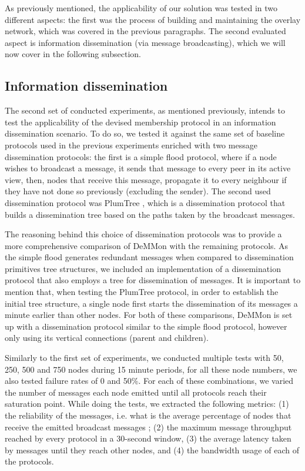 As previously mentioned, the applicability of our solution was tested in two different aspects: the first was the process of building and maintaining the overlay network, which was covered in the previous paragraphs. The second evaluated aspect is information dissemination (via message broadcasting), which we will now cover in the following subsection.

\subsection{Information dissemination} \label{results:inf_diss}

The second set of conducted experiments, as mentioned previously, intends to test the applicability of the devised membership protocol in an information dissemination scenario. To do so, we tested it against the same set of baseline protocols used in the previous experiments enriched with two message dissemination protocols: the first is a simple flood protocol, where if a node wishes to broadcast a message, it sends that message to every peer in its active view, then, nodes that receive this message, propagate it to every neighbour if they have not done so previously (excluding the sender). The second used dissemination protocol was PlumTree \cite{plumTree}, which is a dissemination protocol that builds a dissemination tree based on the paths taken by the broadcast messages.

The reasoning behind this choice of dissemination protocols was to provide a more comprehensive comparison of DeMMon with the remaining protocols. As the simple flood generates redundant messages when compared to dissemination primitives tree structures, we included an implementation of a dissemination protocol that also employs a tree for dissemination of messages. It is important to mention that, when testing the PlumTree protocol, in order to establish the initial tree structure, a single node first starts the dissemination of its messages a minute earlier than other nodes. For both of these comparisons, DeMMon is set up with a dissemination protocol similar to the simple flood protocol, however only using its vertical connections (parent and children).

Similarly to the first set of experiments, we conducted multiple tests with 50, 250, 500 and 750 nodes during 15 minute periods, for all these node numbers, we also tested failure rates of 0 and 50\%. For each of these combinations, we varied the number of messages each node emitted until all protocols reach their saturation point. While doing the tests, we extracted the following metrics: (1) the reliability of the messages, i.e. what is the average percentage of nodes that receive the emitted broadcast messages ; (2) the maximum message throughput reached by every protocol in a 30-second window, (3) the average latency taken by messages until they reach other nodes, and (4) the bandwidth usage of each of the protocols. 

